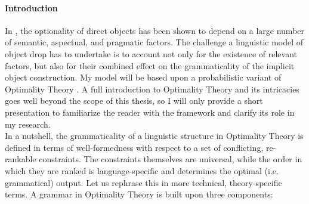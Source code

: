 \paragraph{Introduction} In , the optionality of direct objects has been shown to depend on a large number of semantic, aspectual, and pragmatic factors. The challenge a linguistic model of object drop has to undertake is to account not only for the existence of relevant factors, but also for their combined effect on the grammaticality of the implicit object construction. My model will be based upon a probabilistic variant of Optimality Theory \parencite{princesmolensky1993optimality, PrinceSmolensky2008}. A full introduction to Optimality Theory and its intricacies goes well beyond the scope of this thesis, so I will only provide a short presentation to familiarize the reader with the framework and clarify its role in my research.\\ %
In a nutshell, the grammaticality of a linguistic structure in Optimality Theory is defined in terms of well-formedness with respect to a set of conflicting, re-rankable constraints. The constraints themselves are universal, while the order in which they are ranked is language-specific and determines the optimal (i.e. grammatical) output. Let us rephrase this in more technical, theory-specific terms. A grammar in Optimality Theory is built upon three components:
